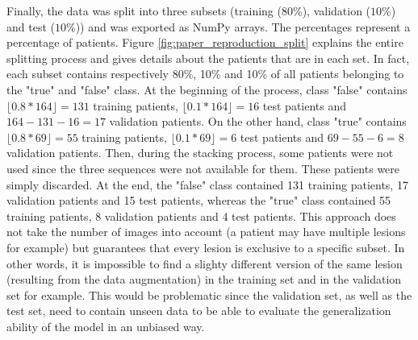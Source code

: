 Finally, the data was split into three subsets (training ($80$\%), validation ($10$\%) and test ($10$\%)) and was exported as NumPy arrays. The percentages represent a percentage of patients. Figure \ref{fig:paper_reproduction_split} explains the entire splitting process and gives details about the patients that are in each set. In fact, each subset contains respectively 80\%, 10\% and 10\% of all patients belonging to the "true" and "false" class. At the beginning of the process, class "false" contains $\lfloor 0.8 * 164 \rfloor = 131$ training patients, $\lfloor 0.1 * 164 \rfloor = 16$ test patients and $164 - 131 - 16 = 17$ validation patients. On the other hand, class "true" contains $\lfloor 0.8 * 69 \rfloor = 55$ training patients, $\lfloor 0.1 * 69 \rfloor = 6$ test patients and $69 - 55 - 6 = 8$ validation patients. Then, during the stacking process, some patients were not used since the three sequences were not available for them. These patients were simply discarded. At the end, the "false" class contained 131 training patients, 17 validation patients and 15 test patients, whereas the "true" class contained 55 training patients, 8 validation patients and 4 test patients. This approach does not take the number of images into account (a patient may have multiple lesions for example) but guarantees that every lesion is exclusive to a specific subset. In other words, it is impossible to find a slighty different version of the same lesion (resulting from the data augmentation) in the training set and in the validation set for example. This would be problematic since the validation set, as well as the test set, need to contain unseen data to be able to evaluate the generalization ability of the model in an unbiased way. 

